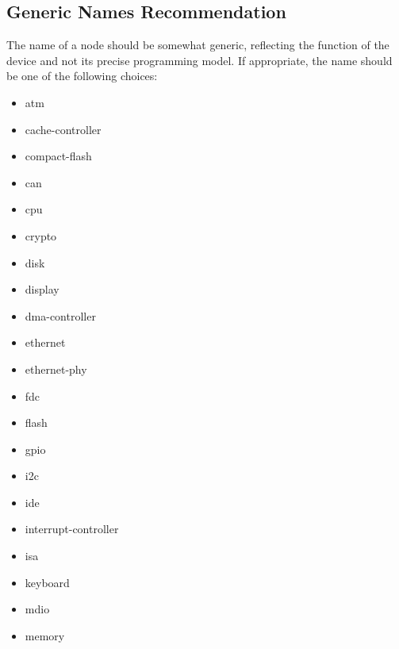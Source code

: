 \documentclass[a4paper,10pt,oneside]{sphinxmanual}
\begin{document}
\subsection{Generic Names Recommendation}
\label{devicetree-basics:generic-names-recommendation}
The name of a node should be somewhat generic, reflecting the function
of the device and not its precise programming model. If appropriate, the
name should be one of the following choices:
\begin{itemize}\setlength{\itemsep}{0pt}\setlength{\parskip}{0pt}
\item {} 
atm

\item {} 
cache-controller

\item {} 
compact-flash

\item {} 
can

\item {} 
cpu

\item {} 
crypto

\item {} 
disk

\item {} 
display

\item {} 
dma-controller

\item {} 
ethernet

\item {} 
ethernet-phy

\item {} 
fdc

\item {} 
flash

\item {} 
gpio

\item {} 
i2c

\item {} 
ide

\item {} 
interrupt-controller

\item {} 
isa

\item {} 
keyboard

\item {} 
mdio

\item {} 
memory


\end{itemize}
\end{document}
